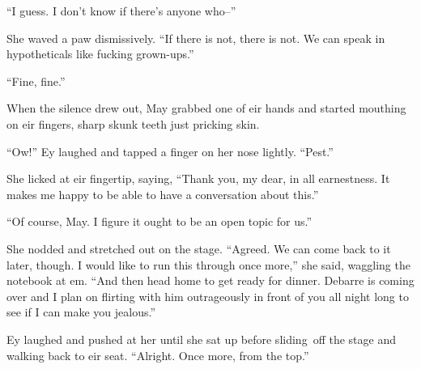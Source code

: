 ``I guess. I don't know if there's anyone who--''

She waved a paw dismissively. ``If there is not, there is not. We can speak in hypotheticals like fucking grown-ups.''

``Fine, fine.''

When the silence drew out, May grabbed one of eir hands and started mouthing on eir fingers, sharp skunk teeth just pricking skin.

``Ow!'' Ey laughed and tapped a finger on her nose lightly. ``Pest.''

She licked at eir fingertip, saying, ``Thank you, my dear, in all earnestness. It makes me happy to be able to have a conversation about this.''

``Of course, May. I figure it ought to be an open topic for us.''

She nodded and stretched out on the stage. ``Agreed. We can come back to it later, though. I would like to run this through once more,'' she said, waggling the notebook at em. ``And then head home to get ready for dinner. Debarre is coming over and I plan on flirting with him outrageously in front of you all night long to see if I can make you jealous.''

Ey laughed and pushed at her until she sat up before sliding\pagebreak\ off the stage and walking back to eir seat. ``Alright. Once more, from the top.''
